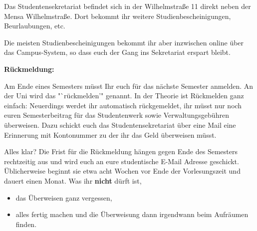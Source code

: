 Das Studentensekretariat befindet sich in der Wilhelmstraße 11 direkt neben der Mensa Wilhelmstraße.
  Dort bekommt ihr weitere Studienbescheinigungen,
  Beurlaubungen, etc.

Die meisten Studienbescheinigungen bekommt ihr aber inzwischen
   online über das Campus-System, so dass euch der Gang ins Sekretariat erspart bleibt. 

\textbf{Rückmeldung:}

Am Ende eines Semesters müsst Ihr euch für das nächste Semester anmelden.
  An der Uni wird das "`rückmelden'" genannt.
  In der Theorie ist Rückmelden ganz
  einfach: Neuerdings werdet ihr automatisch rückgemeldet, ihr
  müsst nur noch euren Semesterbeitrag für das Studentenwerk sowie Verwaltungsgebühren überweisen. Dazu schickt euch das Studentensekretariat über eine Mail eine Erinnerung mit Kontonummer zu der ihr das Geld überweisen müsst. %

Alles klar? Die Frist für die Rückmeldung hängen gegen Ende des
  Semesters rechtzeitig aus und wird euch an eure studentische E-Mail Adresse geschickt.  Üblicherweise beginnt sie etwa acht Wochen
  vor Ende der Vorlesungszeit und dauert einen Monat.
  Was ihr \textbf{nicht} dürft ist,

\begin{itemize}

   \item das Überweisen ganz vergessen,

   \item alles fertig machen und die Überweisung dann irgendwann beim
        Aufräumen finden.

\end{itemize}
